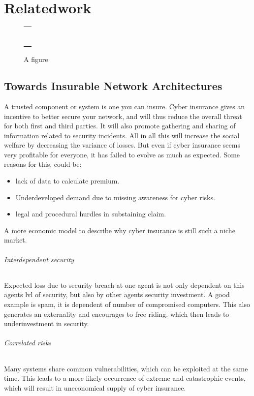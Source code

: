 \chapter{Relatedwork}
\label{chp:relatedwork} 



\begin{figure}
\centering
\begin{tabular}{@{}c@{}}
\rule{.5\textwidth}{.5\textwidth} \\
\end{tabular}
\caption{\label{fig:example}A figure}
\end{figure}

\section{Towards Insurable Network Architectures}\label{sec:first_section}
A trusted component or system is one you can insure.
Cyber insurance gives an incentive to better secure your network, and will thus reduce the overall threat for both first and third parties. It will also promote gathering and sharing of information related to security incidents. All in all this will increase the social welfare by decreasing the variance of losses. 
But even if cyber insurance seems very profitable for everyone, it has failed to evolve as much as expected.
Some reasons for this, could be:
\begin{itemize}[topsep=-1em,parsep=0em,itemsep=0em] 
 \item lack of data to calculate premium. \item Underdeveloped demand due to missing awareness for cyber risks. \item legal and procedural hurdles in substaining claim.
\end{itemize}
A more economic model to describe why cyber insurance is still such a niche market.
\subparagraph{Interdependent security}
Expected loss due to security breach at one agent is not only dependent on this agents lvl of security, but also by other agents security investment. A good example is spam, it is dependent of number of compromised computers. This also generates an externality and encourages to free riding. which then leads to underinvestment in security.
\subparagraph{Correlated risks}
Many systems share common vulnerabilities, which can be exploited at the same time. This leads to a more likely occurrence of extreme and catastrophic events, which will result in uneconomical supply of cyber insurance.

